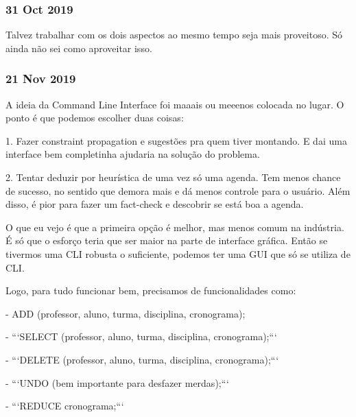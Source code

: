 \documentclass{article}
\begin{document}
\subsubsection{31 Oct 2019}

Talvez trabalhar com os dois aspectos ao mesmo tempo seja mais proveitoso. Só ainda não sei como aproveitar isso.

\subsubsection{21 Nov 2019}

\par A ideia da Command Line Interface foi maaais ou meeenos colocada no lugar. O ponto é que podemos escolher duas coisas:

1. Fazer constraint propagation e sugestões pra quem tiver montando. E dai uma interface bem completinha ajudaria na solução do problema.

2. Tentar deduzir por heurística de uma vez só uma agenda. Tem menos chance de sucesso, no sentido que demora mais e dá menos controle para o usuário. Além disso, é pior para fazer um fact-check e descobrir se está boa a agenda.

\par O que eu vejo é que a primeira opção é melhor, mas menos comum na indústria. É só que o esforço teria que ser maior na parte
de interface gráfica. Então se tivermos uma CLI robusta o suficiente, podemos ter uma GUI que só se utiliza de CLI.

\par Logo, para tudo funcionar bem, precisamos de funcionalidades como:

-     ADD  (professor, aluno, turma, disciplina, cronograma);

- ```SELECT (professor, aluno, turma, disciplina, cronograma);```

- ```DELETE (professor, aluno, turma, disciplina, cronograma);```

- ```UNDO (bem importante para desfazer merdas);```

- ```REDUCE cronograma;```
\end{document}
